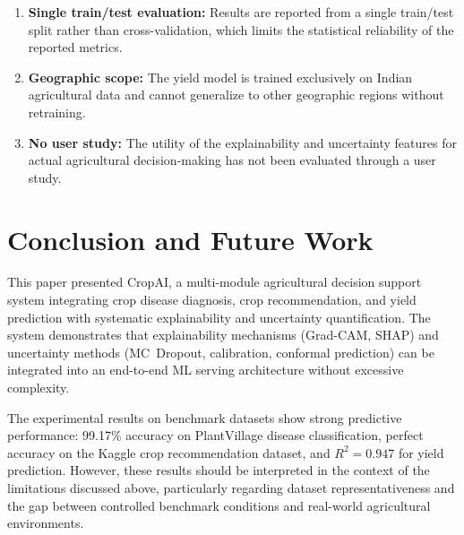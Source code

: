 \documentclass[conference]{IEEEtran}
\begin{document}
\begin{enumerate}[leftmargin=*]
  \item \textbf{Single train/test evaluation:} Results are reported from a single train/test split rather than cross-validation, which limits the statistical reliability of the reported metrics.

  \item \textbf{Geographic scope:} The yield model is trained exclusively on Indian agricultural data and cannot generalize to other geographic regions without retraining.

  \item \textbf{No user study:} The utility of the explainability and uncertainty features for actual agricultural decision-making has not been evaluated through a user study.
\end{enumerate}


\section{Conclusion and Future Work}
\label{sec:conclusion}

This paper presented CropAI, a multi-module agricultural decision support system integrating crop disease diagnosis, crop recommendation, and yield prediction with systematic explainability and uncertainty quantification. The system demonstrates that explainability mechanisms (Grad-CAM, SHAP) and uncertainty methods (MC~Dropout, calibration, conformal prediction) can be integrated into an end-to-end ML serving architecture without excessive complexity.

The experimental results on benchmark datasets show strong predictive performance: 99.17\% accuracy on PlantVillage disease classification, perfect accuracy on the Kaggle crop recommendation dataset, and $R^{2} = 0.947$ for yield prediction. However, these results should be interpreted in the context of the limitations discussed above, particularly regarding dataset representativeness and the gap between controlled benchmark conditions and real-world agricultural environments.
\end{document}
